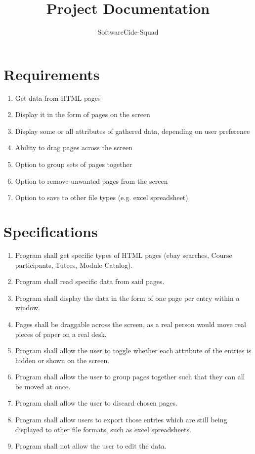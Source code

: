 \documentclass[12pt]{article}
\begin{document}
\title{Project Documentation}
\author{SoftwareCide-Squad}
\maketitle

\section{Requirements}
\begin{enumerate}
\item Get data from HTML pages
\item Display it in the form of pages on the screen
\item Display some or all attributes of gathered data, depending on user preference
\item Ability to drag pages across the screen
\item Option to group sets of pages together
\item Option to remove unwanted pages from the screen
\item Option to save to other file types (e.g. excel spreadsheet)
\end{enumerate}

\section{Specifications}
\begin{enumerate}
\item Program shall get specific types of HTML pages (ebay searches, Course participants, Tutees, Module Catalog).
\item Program shall read specific data from said pages.
\item Program shall display the data in the form of one page per entry within a window.
\item Pages shall be draggable across the screen, as a real person would move real pieces of paper on a real desk.
\item Program shall allow the user to toggle whether each attribute of the entries is hidden or shown on the screen.
\item Program shall allow the user to group pages together such that they can all be moved at once.
\item Program shall allow the user to discard chosen pages.
\item Program shall allow users to export those entries which are still being displayed to other file formats, such as excel spreadsheets.
\item Program shall not allow the user to edit the data.
\end{enumerate}
\end{document}
